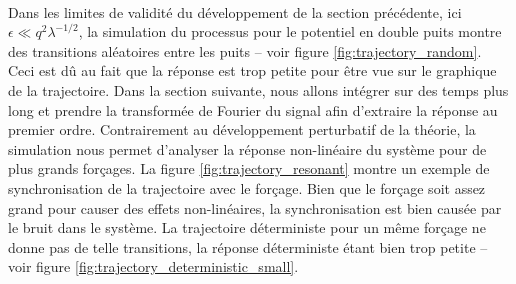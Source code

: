 \paragraph{} Dans les limites de validité du développement de la section précédente, ici $\epsilon \ll q^2 \lambda^{-1/2}$, la simulation du processus pour le potentiel en double puits montre des transitions aléatoires entre les puits -- voir figure \ref{fig:trajectory_random}. Ceci est dû au fait que la réponse est trop petite pour être vue sur le graphique de la trajectoire. Dans la section suivante, nous allons intégrer sur des temps plus long et prendre la transformée de Fourier du signal afin d'extraire la réponse au premier ordre. Contrairement au développement perturbatif de la théorie, la simulation nous permet d'analyser la réponse non-linéaire du système pour de plus grands forçages. La figure \ref{fig:trajectory_resonant} montre un exemple de synchronisation de la trajectoire avec le forçage. Bien que le forçage soit assez grand pour causer des effets non-linéaires, la synchronisation est bien causée par le bruit dans le système. La trajectoire déterministe pour un même forçage ne donne pas de telle transitions, la réponse déterministe étant bien trop petite -- voir figure \ref{fig:trajectory_deterministic_small}.


